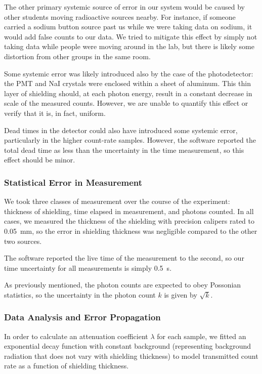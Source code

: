 \documentclass[letter]{article}
\begin{document}
The other primary systemic source of error in our system would be caused by other students moving radioactive sources nearby. For instance, if someone carried a sodium button source past us while we were taking data on sodium, it would add false counts to our data. We tried to mitigate this effect by simply not taking data while people were moving around in the lab, but there is likely some distortion from other groups in the same room.

Some systemic error was likely introduced also by the case of the photodetector: the PMT and NaI crystals were enclosed within a sheet of aluminum. This thin layer of shielding should, at each photon energy, result in a constant decrease in scale of the measured counts. However, we are unable to quantify this effect or verify that it is, in fact, uniform. 

Dead times in the detector could also have introduced some systemic error, particularly in the higher count-rate samples. However, the software reported the total dead time as less than the uncertainty in the time measurement, so this effect should be minor.


\subsubsection{Statistical Error in Measurement}

We took three classes of measurement over the course of the experiment: thickness of shielding, time elapsed in measurement, and photons counted. In all cases, we measured the thickness of the shielding with precision calipers rated to \qty{0.05}{\mm}, so the error in shielding thickness was negligible compared to the other two sources.

The software reported the live time of the measurement to the second, so our time uncertainty for all measurements is simply \qty{0.5}{\s}.

As previously mentioned, the photon counts are expected to obey Possonian statistics, so the uncertainty in the photon count $k$ is given by $\sqrt{k}$. 

\subsubsection{Data Analysis and Error Propagation}

In order to calculate an attenuation coefficient $\lambda$ for each sample, we fitted an exponential decay function with constant background (representing background radiation that does not vary with shielding thickness) to model transmitted count rate as a function of shielding thickness.
\end{document}
